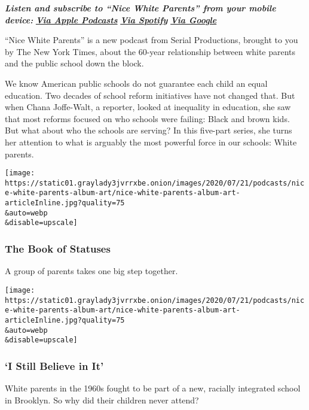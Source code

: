 \emph{\textbf{Listen and subscribe to ``Nice White Parents'' from your
mobile device:}}
\textbf{\href{https://podcasts.apple.com/us/podcast/nice-white-parents/id1524080195}{\emph{Via
Apple Podcasts}}} \emph{\textbf{\textbar{}}}
\textbf{\href{https://open.spotify.com/show/7oBSLCZFCgpdCaBjIG8mLV?si=YcEPLD3xT2ejXmpQz-tRpw}{\emph{Via
Spotify}}} \emph{\textbf{\textbar{}}}
\textbf{\href{https://podcasts.google.com/feed/aHR0cHM6Ly9yc3MuYXJ0MTkuY29tL25pY2Utd2hpdGUtcGFyZW50cw}{\emph{Via
Google}}}

``Nice White Parents'' is a new podcast from Serial Productions, brought
to you by The New York Times, about the 60-year relationship between
white parents and the public school down the block.

We know American public schools do not guarantee each child an equal
education. Two decades of school reform initiatives have not changed
that. But when Chana Joffe-Walt, a reporter, looked at inequality in
education, she saw that most reforms focused on who schools were
failing: Black and brown kids. But what about who the schools are
serving? In this five-part series, she turns her attention to what is
arguably the most powerful force in our schools: White parents.

\texttt{[image: https://static01.graylady3jvrrxbe.onion/images/2020/07/21/podcasts/nice-white-parents-album-art/nice-white-parents-album-art-articleInline.jpg?quality=75\\\&auto=webp\\\&disable=upscale]}

\hypertarget{the-book-of-statuses}{%
\subsubsection{The Book of Statuses}\label{the-book-of-statuses}}

A group of parents takes one big step together.

\texttt{[image: https://static01.graylady3jvrrxbe.onion/images/2020/07/21/podcasts/nice-white-parents-album-art/nice-white-parents-album-art-articleInline.jpg?quality=75\\\&auto=webp\\\&disable=upscale]}

\hypertarget{i-still-believe-in-it}{%
\subsubsection{`I Still Believe in It'}\label{i-still-believe-in-it}}

White parents in the 1960s fought to be part of a new, racially
integrated school in Brooklyn. So why did their children never attend?

